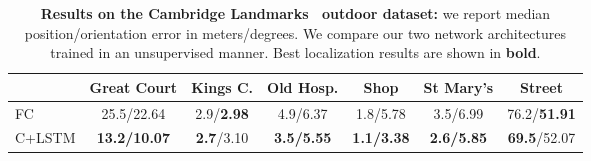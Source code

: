 \begin{table}
\centering

\begin{footnotesize}
\renewcommand{\arraystretch}{1.1}
\setlength{\tabcolsep}{4.5pt}
\begin{tabular}{l | c c c c c c }
				&	Great Court	&	Kings C.	&	Old Hosp.	&	Shop &	St Mary's &	Street \\
	\hline	
	\hline	
{FC} 	& 				{25.5/22.64} & {2.9/\textbf{2.98}} & {4.9/6.37} & {1.8/5.78} & {3.5/6.99} & {76.2/\textbf{51.91}} \\
{C+LSTM} & \textbf{13.2/10.07} & \textbf{2.7}/3.10	& \textbf{3.5/5.55} & \textbf{1.1/3.38} & \textbf{2.6/5.85} & {\textbf{69.5}/52.07} \\
\hline
\end{tabular}
\end{footnotesize}

\caption[FC vs LSTM architecture]{\label{tab:outdoor} \textbf{Results on the Cambridge Landmarks~\citep{Kendall2015} outdoor dataset:} we report median position/orientation error in meters/degrees. We compare our two network architectures trained in an unsupervised manner. Best localization results are shown in \textbf{bold}.}

\end{table}